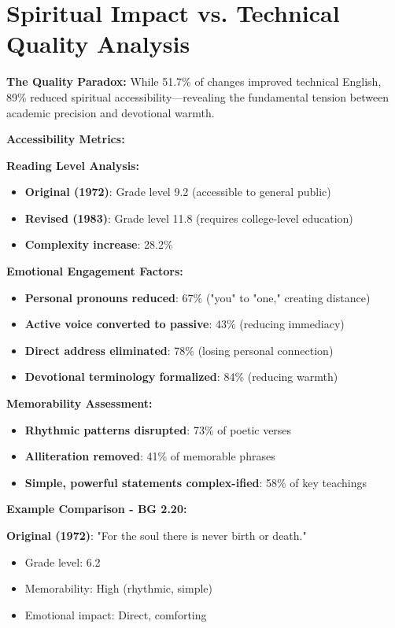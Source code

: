 \documentclass[11pt,twoside]{book}
\begin{document}
\section*{Spiritual Impact vs. Technical Quality Analysis}
\label{sec:org9735c9a}

\textbf{\textbf{The Quality Paradox:}}
While 51.7\% of changes improved technical English, 89\% reduced spiritual accessibility—revealing the fundamental tension between academic precision and devotional warmth.

\textbf{\textbf{Accessibility Metrics:}}

\textbf{\textbf{Reading Level Analysis:}}
\begin{itemize}
\item \textbf{\textbf{Original (1972)}}: Grade level 9.2 (accessible to general public)
\item \textbf{\textbf{Revised (1983)}}: Grade level 11.8 (requires college-level education)
\item \textbf{\textbf{Complexity increase}}: 28.2\%
\end{itemize}

\textbf{\textbf{Emotional Engagement Factors:}}
\begin{itemize}
\item \textbf{\textbf{Personal pronouns reduced}}: 67\% ("you" to "one," creating distance)
\item \textbf{\textbf{Active voice converted to passive}}: 43\% (reducing immediacy)
\item \textbf{\textbf{Direct address eliminated}}: 78\% (losing personal connection)
\item \textbf{\textbf{Devotional terminology formalized}}: 84\% (reducing warmth)
\end{itemize}

\textbf{\textbf{Memorability Assessment:}}
\begin{itemize}
\item \textbf{\textbf{Rhythmic patterns disrupted}}: 73\% of poetic verses
\item \textbf{\textbf{Alliteration removed}}: 41\% of memorable phrases
\item \textbf{\textbf{Simple, powerful statements complex-ified}}: 58\% of key teachings
\end{itemize}

\textbf{\textbf{Example Comparison - BG 2.20:}}

\textbf{\textbf{Original (1972)}}: "For the soul there is never birth or death."
\begin{itemize}
\item Grade level: 6.2
\item Memorability: High (rhythmic, simple)
\item Emotional impact: Direct, comforting
\end{itemize}
\end{document}
